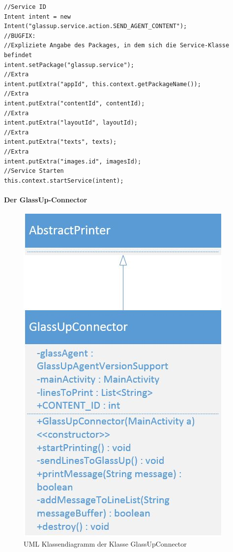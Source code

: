\begin{lstlisting}
//Service ID
Intent intent = new Intent("glassup.service.action.SEND_AGENT_CONTENT");
//BUGFIX:
//Expliziete Angabe des Packages, in dem sich die Service-Klasse befindet
intent.setPackage("glassup.service");
//Extra
intent.putExtra("appId", this.context.getPackageName());
//Extra
intent.putExtra("contentId", contentId);
//Extra
intent.putExtra("layoutId", layoutId);
//Extra
intent.putExtra("texts", texts);
//Extra
intent.putExtra("images.id", imagesId);
//Service Starten
this.context.startService(intent); 
\end{lstlisting}

\paragraph{Der GlassUp-Connector}
\begin{figure}
	\includegraphics[width=\linewidth]{../images/GlassUpConnector.JPG}
	\caption{UML Klassendiagramm der Klasse GlassUpConnector}
	\label{fig:GlassUpConnector}
\end{figure}
